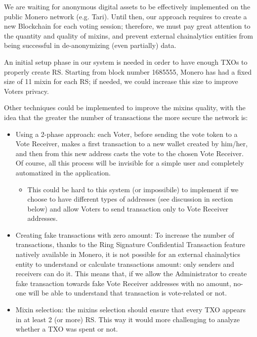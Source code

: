 \documentclass[10pt, letterpaper]{article}
\begin{document}
We are waiting for anonymous digital assets to be effectively implemented on the public Monero network (e.g. Tari). Until then, our approach requires to create a new Blockchain for each voting session; therefore, we must pay great attention to the quantity and quality of mixins, and prevent external chainalytics entities from being successful in de-anonymizing (even partially) data. 
\bigskip

An initial setup phase in our system is needed in order to have enough TXOs to properly create RS. Starting from block number 1685555, Monero has had a fixed size of 11 mixin for each RS; if needed, we could increase this size to improve Voters privacy. 
\bigskip

Other techniques could be implemented to improve the mixins quality, with the idea that the greater the number of transactions the more secure the network is:
\begin{itemize}
\item Using a 2-phase approach: each Voter, before sending the vote token to a Vote Receiver, makes a first transaction to a new wallet created by him/her, and then from this new address casts the vote to the chosen Vote Receiver. Of course, all this process will be invisible for a simple user and completely automatized in the application.
\begin{itemize}
\item This could be hard to this system (or impossibile) to implement if we choose to have different types of addresses (see discussion in section below) and allow Voters to send transaction only to Vote Receiver addresses.
\end{itemize}
\item Creating fake transactions with zero amount: To increase the number of transactions, thanks to the Ring Signature Confidential Transaction feature natively available in Monero, it is not possible for an external chainalytics entity to understand or calculate transactions amount: only senders and receivers can do it. This means that, if we allow the Administrator to create fake transaction towards fake Vote Receiver addresses with no amount, no-one will be able to understand that transaction is vote-related or not. 
\item Mixin selection: the mixins selection should ensure that every TXO appears in at least 2 (or more) RS. This way it would more challenging to analyze whether a TXO was spent or not.
\end{itemize}
\end{document}
